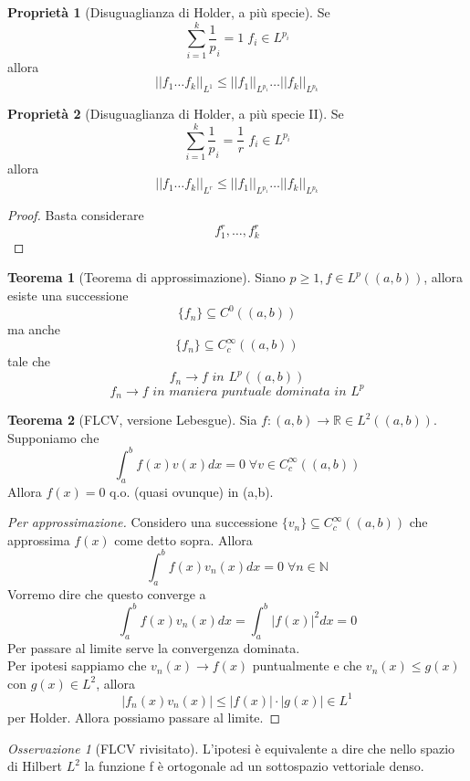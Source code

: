 \documentclass[a4paper]{book}
\theoremstyle{definition}
\theoremstyle{remark}
\newtheorem{oss}{Osservazione}
\theoremstyle{definition}
\newtheorem{teo}{Teorema}
\newtheorem{prop}{Proprietà}
\newcommand{\bbr}{\mathbb{R}}
\newcommand{\bbn}{\mathbb{N}}
\begin{document}
\begin{prop}[Disuguaglianza di Holder, a più specie]
	Se $$\sum_{i=1}^{k} \frac1p_i = 1 \; f_i \in L^{p_i}$$ allora 
	$$||f_1 \dots f_k||_{L^1} \le ||f_1||_{L^{p_1}} \dots ||f_k||_{L^{p_k}}$$
\end{prop}

\begin{prop}[Disuguaglianza di Holder, a più specie II]
	Se $$\sum_{i=1}^{k} \frac1p_i = \frac1r \; f_i \in L^{p_i}$$ allora 
	$$||f_1 \dots f_k||_{L^r} \le ||f_1||_{L^{p_1}} \dots ||f_k||_{L^{p_k}}$$
\end{prop}

\begin{proof}
	Basta considerare $$f_1^r, \dots, f_k^r$$
\end{proof}

\begin{teo}[Teorema di approssimazione]
	Siano $p \ge 1, f \in L^p((a,b))$, allora esiste una successione
	$$\{f_n\}\subseteq C^0((a,b))$$
	ma anche
	$$\{f_n\}\subseteq C^\infty_c((a,b))$$
	tale che 
	$$f_n \to f \textit{ in } L^p((a,b))$$
	$$f_n \to f \textit{ in maniera puntuale dominata in } L^p$$
\end{teo}

\begin{teo}[FLCV, versione Lebesgue]
	Sia $f:(a,b)\to \bbr \in L^2((a,b))$. Supponiamo che 
	$$\int_{a}^{b}f(x)v(x)dx = 0 \; \forall v \in C^\infty_c((a,b))$$
	Allora $f(x) = 0$ q.o. (quasi ovunque) in (a,b).
\end{teo}

\begin{proof}[Per approssimazione]
	Considero una successione $\{v_n\}\subseteq C^\infty_c((a,b))$ che approssima $f(x)$ come detto sopra. Allora
	$$\int_a^b f(x)v_n(x) dx = 0 \; \forall n \in \bbn$$
	Vorremo dire che questo converge a $$\int_a^b f(x)v_n(x) dx = \int_a^b|f(x)|^2 dx = 0$$ 
	Per passare al limite serve la convergenza dominata.
	\\
	Per ipotesi sappiamo che $v_n(x) \to f(x)$ puntualmente e che $v_n(x) \le g(x)$ con $g(x) \in L^2$, allora 
	$$|f_n(x)v_n(x)| \le |f(x)| \cdot |g(x)| \in L^1$$ per Holder. Allora possiamo passare al limite.	
\end{proof}

\begin{oss}[FLCV rivisitato]
	L'ipotesi è equivalente a dire che nello spazio di Hilbert $L^2$ la funzione f è ortogonale ad un sottospazio vettoriale denso.
\end{oss}
\end{document}
